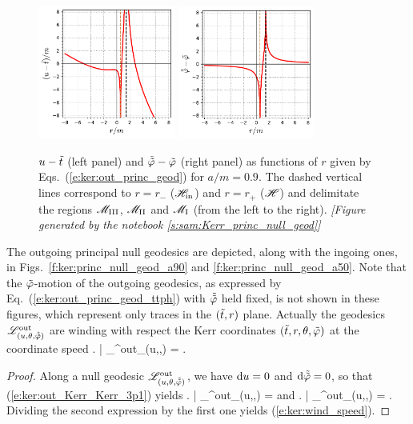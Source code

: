 \begin{figure}
\centerline{\includegraphics[width=0.4\textwidth]{ker_u_r.pdf}\qquad
\includegraphics[width=0.4\textwidth]{ker_ttphi_r.pdf}
}
\caption[]{\label{f:ker:u_ttphi_r} \footnotesize
$u - {\tilde t}$ (left panel) and $\tilde{{\tilde\varphi}} - {\tilde\varphi}$ (right panel) as functions
of $r$ given by Eqs.~(\ref{e:ker:out_princ_geod}) for $a/m = 0.9$.
The dashed vertical lines
correspond to $r=r_-$ ($\mathscr{H}_{\rm in}$) and $r=r_+$ ($\mathscr{H}$) and
delimitate the regions $\mathscr{M}_{\rm III}$, $\mathscr{M}_{\rm II}$ and $\mathscr{M}_{\rm I}$ (from
the left to the right).
\textsl{[Figure generated by the notebook \ref{s:sam:Kerr_princ_null_geod}]}
}
\end{figure}


The outgoing principal null geodesics
are depicted, along with the
ingoing ones, in Figs.~\ref{f:ker:princ_null_geod_a90} and
\ref{f:ker:princ_null_geod_a50}. Note that the ${\tilde\varphi}$-motion of the
outgoing geodesics, as expressed by Eq.~(\ref{e:ker:out_princ_geod_ttph}) with $\tilde{{\tilde\varphi}}$
held fixed, is not shown in these figures, which represent only traces
in the $({\tilde t},r)$ plane. Actually the geodesics $\mathscr{L}^{\rm out}_{(u,\theta,\tilde{{\tilde\varphi}})}$
are winding with respect the Kerr coordinates $({\tilde t},r,\theta,{\tilde\varphi})$
at the coordinate speed
\be \label{e:ker:wind_speed}
    \left. \frac{\D\tph}{\D\ti} \right| _{\Li^{\rm out}_{(u,\th,\tilde{\tph})}} =
     .
\ee
\begin{proof}
Along a null geodesic $\mathscr{L}^{\rm out}_{(u,\theta,\tilde{{\tilde\varphi}})}$, we have
$\mathrm{d} u = 0$ and $\mathrm{d}\tilde{{\tilde\varphi}}=0$, so that (\ref{e:ker:out_Kerr_Kerr_3p1}) yields
\be \label{e:ker:dtdr_dphdr_out}
\left.  \right| _{\Li^{\rm out}_{(u,\th,\tilde{\tph})}}  =     \qquad\mbox{and}\qquad
\left.  \right| _{\Li^{\rm out}_{(u,\th,\tilde{\tph})}} =  .
\ee
Dividing the second expression by the first one yields (\ref{e:ker:wind_speed}).
\end{proof}

